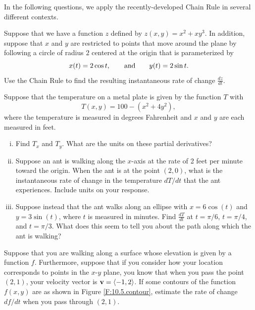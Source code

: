 \begin{activity} \label{PA:10.11} In the following questions, we apply the recently-developed Chain Rule in several different contexts.
  \ba
  \item Suppose that we have a function $z$ defined by $z(x,y) = x^2+xy^3$.  In addition, suppose that $x$ and $y$ are restricted to points that move around the plane by following
  a circle of radius $2$ centered at the origin that is parameterized by
    $$
    x(t) = 2\cos t,
    \hspace*{20pt}
    \mbox{and}
    \hspace*{20pt}
    y(t) = 2\sin t.
    $$
    Use the Chain Rule to find the resulting instantaneous rate of change $\frac{dz}{dt}$.  
      
  \item Suppose that the temperature on a metal plate is given by
    the function $T$ with 
    $$
    T(x,y) = 100-(x^2 + 4y^2),
    $$
    where the temperature is measured in degrees Fahrenheit
    and $x$ and $y$ are each measured in feet. 
    
    \begin{enumerate}[i.]
    \item Find $T_x$ and $T_y$.  What are the units on these partial
      derivatives?    
    \item Suppose an ant is walking along the $x$-axis at the rate
      of 2 feet per minute toward the origin.  When the ant is at
      the point $(2,0)$, what is the
      instantaneous rate of change in the temperature $dT/dt$ that
      the ant experiences.  Include units on
      your response.
    \item Suppose instead that the ant walks along an ellipse
      with $x = 6\cos(t)$ and $y = 3\sin(t)$, where
      $t$ is measured in minutes.  Find $\frac{dT}{dt}$ at
      $t = \pi/6$, $t=\pi/4$, and $t = \pi/3$.  What does this
      seem to tell you about the path along which the ant is
      walking?
    \end{enumerate}


  \item Suppose that you are walking along a surface whose elevation is given by a function $f$.  Furthermore, suppose that if you consider how your location corresponds to points in the $x$-$y$ plane, you know that when you pass the point $(2,1)$, your velocity vector is $\mathbf{v}=\langle -1,2\rangle$.  If some contours of the function $f(x,y)$ are as
    shown in Figure \ref{F:10.5.contour}, estimate the rate of change
    $df/dt$ when you pass through $(2,1)$.


\end{activity}
